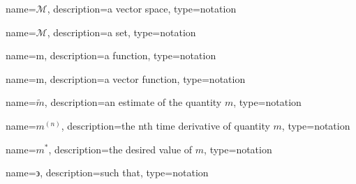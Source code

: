 	\newcommand{\vecspace}[1]{\ensuremath{\mathscr{#1}}}
	{%
		name=\vecspace{M},
		description=a vector space,
		type=notation
	}

	\newcommand{\set}[1]{\ensuremath{\mathcal{#1}}}
	{%
		name=\set{M},
		description=a set,
		type=notation
	}

	\newcommand{\func}[1]{\ensuremath{\mathrm{#1}}}
	{%
		name=\func{m},
		description=a function,
		type=notation
	}

	\newcommand{\vecfunc}[1]{\ensuremath{\boldsymbol{\mathrm{#1}}}}
	{%
		name=\vecfunc{m},
		description=a vector function,
		type=notation
	}

	\newcommand{\estimate}[1]{\ensuremath{\widetilde{#1}}}
	{%
		name=\estimate{m},
		description=an estimate of the quantity $m$,
		type=notation
	}

	\newcommand{\tdern}[2]{\ensuremath{{#1}^{(#2)}}}
	{%
		name=\tdern{m}{n},
		description=the nth time derivative of quantity $m$,
		type=notation
	}

	\newcommand{\desired}[1]{\ensuremath{{#1}^{*}}}
	{%
		name=\desired{m},
		description=the desired value of $m$,
		type=notation
	}

	{%
		name={\ensuremath{\backepsilon}},
		description=such that,
		type=notation
	}
	\newcommand{\suchthat}{\gls{not:suchthat}}
